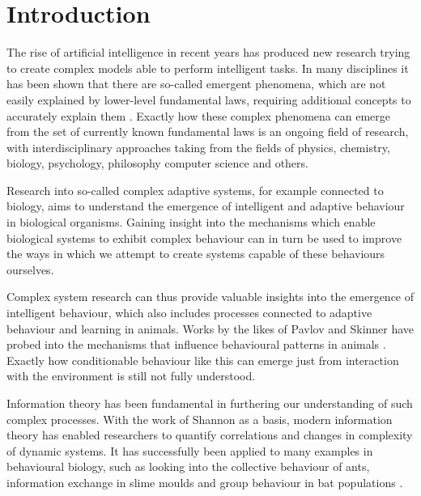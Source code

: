 \documentclass[12pt,a4paper]{article}
\begin{document}

\newpage
\tableofcontents
\thispagestyle{empty}
\newpage
{}

\section{Introduction} \label{sec:introduction}
The rise of artificial intelligence in recent years has produced new research trying to create complex models able to perform intelligent tasks.
In many disciplines it has been shown that there are so-called emergent phenomena, which are not easily explained by lower-level fundamental laws, requiring additional concepts to accurately explain them \autocite{anderson1972more}.
Exactly how these complex phenomena can emerge from the set of currently known fundamental laws is an ongoing field of research, with interdisciplinary approaches taking from the fields of physics, chemistry, biology, psychology, philosophy computer science and others.

Research into  so-called complex adaptive systems, for example connected to biology, aims to understand the emergence of intelligent and adaptive behaviour in biological organisms.
Gaining insight into the mechanisms which enable biological systems to exhibit complex behaviour can in turn be used to improve the ways in which we attempt to create systems capable of these behaviours ourselves.

Complex system research can thus provide valuable insights into the emergence of intelligent behaviour, which also includes processes connected to adaptive behaviour and learning in animals.
Works by the likes of Pavlov and Skinner have probed into the mechanisms that influence behavioural patterns in animals \autocite{pavlov1906scientific, skinner1957experimental}.
Exactly how conditionable behaviour like this can emerge just from interaction with the environment is still not fully understood.

Information theory has been fundamental in furthering our understanding of such complex processes.
With the work of Shannon \autocite{shannon1948} as a basis, modern information theory has enabled researchers to quantify correlations and changes in complexity of dynamic systems.
It has successfully been applied to many examples in behavioural biology, such as looking into the collective behaviour of ants, information exchange in slime moulds and group behaviour in bat populations \autocite{kim2021informational}.
\end{document}

